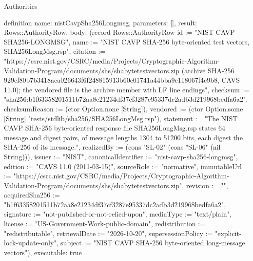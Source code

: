 \begin{lexlean}{Authorities}
\begin{semanticmodule}
definition{
  name: nistCavpSha256Longmsg,
  parameters: [],
  result: Rows::AuthorityRow,
  body: (record Rows::AuthorityRow {id := "NIST-CAVP-SHA256-LONGMSG", name := "NIST CAVP SHA-256 byte-oriented test vectors, SHA256LongMsg.rsp", citation := "https://csrc.nist.gov/CSRC/media/Projects/Cryptographic-Algorithm-Validation-Program/documents/shs/shabytetestvectors.zip (archive SHA-256 929ef80b7b3418aca026643f6f248815913b60e01741a44bba9e118067f4c9b8, CAVS 11.0); the vendored file is the archive member with LF line endings", checksum := "sha256:b1f63358201511b72aa8e21234df37cf3287e95337dc2adb3d219968bedfa6a2", checksumReason := (ctor Option.none [String]), vendored := (ctor Option.some [String] "tests/stdlib/sha256/SHA256LongMsg.rsp"), statement := "The NIST CAVP SHA-256 byte-oriented response file SHA256LongMsg.rsp states 64 message and digest pairs, of message lengths 1304 to 51200 bits, each digest the SHA-256 of its message.", realizedBy := (cons "SL-02" (cons "SL-06" (nil String))), issuer := "NIST", canonicalIdentifier := "nist-cavp-sha256-longmsg", edition := "CAVS 11.0 (2011-03-15)", sourceRole := "normative", immutableUrl := "https://csrc.nist.gov/CSRC/media/Projects/Cryptographic-Algorithm-Validation-Program/documents/shs/shabytetestvectors.zip", revision := "", acquiredSha256 := "b1f63358201511b72aa8e21234df37cf3287e95337dc2adb3d219968bedfa6a2", signature := "not-published-or-not-relied-upon", mediaType := "text/plain", license := "US-Government-Work-public-domain", redistribution := "redistributable", retrievalDate := "2026-10-20", supersessionPolicy := "explicit-lock-update-only", subject := "NIST CAVP SHA-256 byte-oriented long-message vectors"}),
  executable: true
}
\end{semanticmodule}
\end{lexlean}
